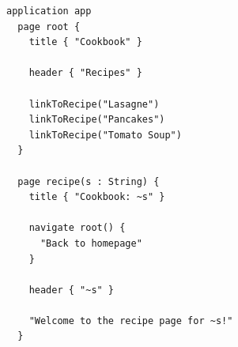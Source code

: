       \begin{figure}
        \begin{subfigure}[t]{0.45\textwidth}
          \begin{verbatim}
application app
  page root {
    title { "Cookbook" }

    header { "Recipes" }

    linkToRecipe("Lasagne")
    linkToRecipe("Pancakes")
    linkToRecipe("Tomato Soup")
  }

  page recipe(s : String) {
    title { "Cookbook: ~s" }

    navigate root() {
      "Back to homepage"
    }

    header { "~s" }

    "Welcome to the recipe page for ~s!"
  }


\end{verbatim}
\end{subfigure}
\end{figure}
